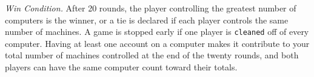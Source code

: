 {\em Win Condition.}
After 20 rounds, the player controlling the greatest number of computers is the winner, or a tie is declared if each player controls the same number of machines. A game is stopped early if one player is {\tt cleaned} off of every computer. 
Having at least one account on a computer makes it contribute to your total number of machines controlled at the end of the twenty rounds, and both players can have the same computer count toward their totals.  

